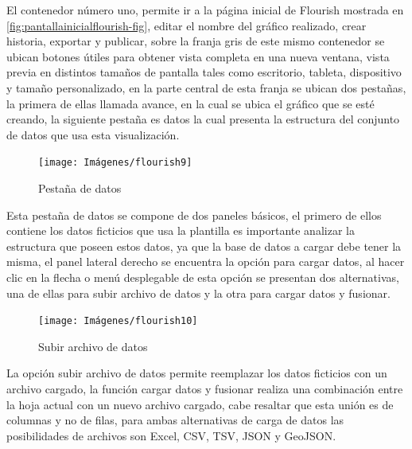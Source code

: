 \documentclass[
]{book}
\begin{document}
El contenedor número uno, permite ir a la página inicial de Flourish mostrada en \ref{fig:pantallainicialflourish-fig}, editar el nombre del gráfico realizado, crear historia, exportar y publicar, sobre la franja gris de este mismo contenedor se ubican botones útiles para obtener vista completa en una nueva ventana, vista previa en distintos tamaños de pantalla tales como escritorio, tableta, dispositivo y tamaño personalizado, en la parte central de esta franja se ubican dos pestañas, la primera de ellas llamada avance, en la cual se ubica el gráfico que se esté creando, la siguiente pestaña es datos la cual presenta la estructura del conjunto de datos que usa esta visualización.

\begin{figure}

{\centering \texttt{[image: Imágenes/flourish9]} 

}

\caption{Pestaña de datos}\label{fig:pestanadatosflourish-fig}
\end{figure}

Esta pestaña de datos se compone de dos paneles básicos, el primero de ellos contiene los datos ficticios que usa la plantilla es importante analizar la estructura que poseen estos datos, ya que la base de datos a cargar debe tener la misma, el panel lateral derecho se encuentra la opción para cargar datos, al hacer clic en la flecha o menú desplegable de esta opción se presentan dos alternativas, una de ellas para subir archivo de datos y la otra para cargar datos y fusionar.

\begin{figure}

{\centering \texttt{[image: Imágenes/flourish10]} 

}

\caption{Subir archivo de datos}\label{fig:pestanadatossubirdatosflourish-fig}
\end{figure}

La opción subir archivo de datos permite reemplazar los datos ficticios con un archivo cargado, la función cargar datos y fusionar realiza una combinación entre la hoja actual con un nuevo archivo cargado, cabe resaltar que esta unión es de columnas y no de filas, para ambas alternativas de carga de datos las posibilidades de archivos son Excel, CSV, TSV, JSON y GeoJSON.
\end{document}
